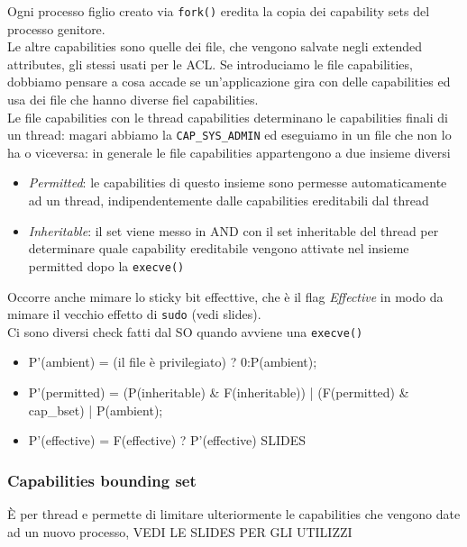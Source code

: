 \documentclass[12pt, oneside]{extbook} %
\begin{document}
Ogni processo figlio creato via \texttt{fork()} eredita la copia dei capability sets del processo genitore.\\Le altre capabilities sono quelle dei file, che vengono salvate negli extended attributes, gli stessi usati per le ACL. Se introduciamo le file capabilities, dobbiamo pensare a cosa accade se un'applicazione gira con delle capabilities ed usa dei file che hanno diverse fiel capabilities.\\Le file capabilities con le thread capabilities determinano le capabilities finali di un thread: magari abbiamo la \texttt{CAP\_SYS\_ADMIN} ed eseguiamo in un file che non lo ha o viceversa: in generale le file capabilities appartengono a due insieme diversi
\begin{itemize}
\item \textit{Permitted}: le capabilities di questo insieme sono permesse automaticamente ad un thread, indipendentemente dalle capabilities ereditabili dal thread
\item \textit{Inheritable}: il set viene messo in AND con il set inheritable del thread per determinare quale capability ereditabile vengono attivate nel insieme permitted dopo la \texttt{execve()}
\end{itemize}
Occorre anche mimare lo sticky bit effecttive, che è il flag \textit{Effective} in modo da mimare il vecchio effetto di \texttt{sudo} (vedi slides).\\Ci sono diversi check fatti dal SO quando avviene una \texttt{execve()}
\begin{itemize}
\item P'(ambient) = (il file è privilegiato) ? 0:P(ambient);
\item P'(permitted) = (P(inheritable) \& F(inheritable)) | (F(permitted) \& cap\_bset) | P(ambient);
\item P'(effective) = F(effective) ? P'(effective) SLIDES
\end{itemize}
\subsubsection{Capabilities bounding set} 
È per thread e permette di limitare ulteriormente le capabilities che vengono date ad un nuovo processo, VEDI LE SLIDES PER GLI UTILIZZI
\end{document}
